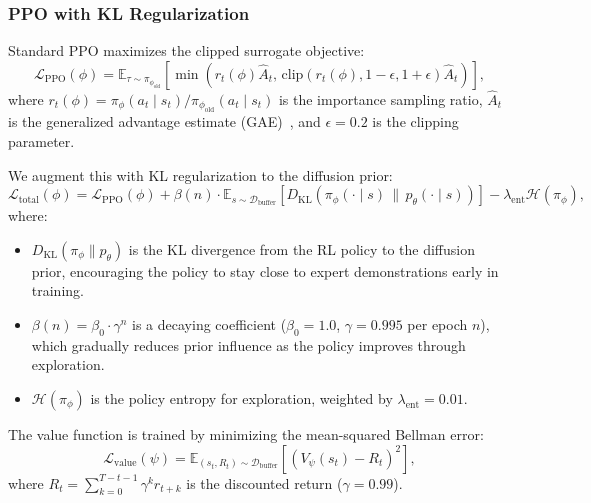 \subsubsection{PPO with KL Regularization}

Standard PPO maximizes the clipped surrogate objective:
\begin{equation}
\mathcal{L}_{\text{PPO}}(\phi) = \mathbb{E}_{\tau \sim \pi_{\phi_{\text{old}}}}
\left[
\min\left(
r_t(\phi) \hat{A}_t, \,
\text{clip}(r_t(\phi), 1-\epsilon, 1+\epsilon) \hat{A}_t
\right)
\right],
\label{eq:ppo_loss}
\end{equation}
where $r_t(\phi) = \pi_\phi(a_t \mid s_t) / \pi_{\phi_{\text{old}}}(a_t \mid s_t)$
is the importance sampling ratio, $\hat{A}_t$ is the generalized advantage estimate
(GAE)~\citep{schulman2015gae}, and $\epsilon=0.2$ is the clipping parameter.

We augment this with KL regularization to the diffusion prior:
\begin{equation}
\mathcal{L}_{\text{total}}(\phi) = \mathcal{L}_{\text{PPO}}(\phi)
+ \beta(n) \cdot \mathbb{E}_{s \sim \mathcal{D}_{\text{buffer}}}
\left[ D_{\text{KL}}(\pi_\phi(\cdot \mid s) \,\|\, p_\theta(\cdot \mid s)) \right]
- \lambda_{\text{ent}} \mathcal{H}(\pi_\phi),
\label{eq:total_loss}
\end{equation}
where:
\begin{itemize}
    \item $D_{\text{KL}}(\pi_\phi \| p_\theta)$ is the KL divergence from the RL
    policy to the diffusion prior, encouraging the policy to stay close to expert
    demonstrations early in training.

    \item $\beta(n) = \beta_0 \cdot \gamma^{n}$ is a decaying coefficient
    ($\beta_0=1.0$, $\gamma=0.995$ per epoch $n$), which gradually reduces prior
    influence as the policy improves through exploration.

    \item $\mathcal{H}(\pi_\phi)$ is the policy entropy for exploration, weighted
    by $\lambda_{\text{ent}}=0.01$.
\end{itemize}

The value function is trained by minimizing the mean-squared Bellman error:
\begin{equation}
\mathcal{L}_{\text{value}}(\psi) = \mathbb{E}_{(s_t,R_t) \sim \mathcal{D}_{\text{buffer}}}
\left[ (V_\psi(s_t) - R_t)^2 \right],
\end{equation}
where $R_t = \sum_{k=0}^{T-t-1} \gamma^k r_{t+k}$ is the discounted return
($\gamma=0.99$).

